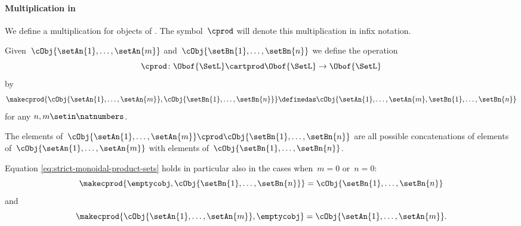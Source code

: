 {\paragraph{Multiplication in \SetL}
\label{sec:multiplication-for-SetL}
We define a multiplication for objects of \SetL.
The symbol~$\cprod$ will denote this multiplication in infix notation.

Given~$\cObj{\setAn{1}, \ldots, \setAn{m}}$ and~$\cObj{\setBn{1}, \ldots, \setBn{n}}$ we define the operation
\begin{equation}
    \label{eq:mult-setl-sign}
    \cprod \colon \Obof{\SetL} \cartprod \Obof{\SetL} \to \Obof{\SetL}
\end{equation}
by
\begin{equation}
    \label{eq:strict-monoidal-product-sets}
    \makecprod{
        \cObj{\setAn{1}, \ldots, \setAn{m}},
        \cObj{\setBn{1}, \ldots, \setBn{n}}
    } \definedas \cObj{\setAn{1}, \ldots, \setAn{m}, \setBn{1}, \ldots, \setBn{n}}
\end{equation}
for any $n, m \setin \natnumbers$.

The elements of~$\cObj{\setAn{1}, \ldots, \setAn{m}} \cprod \cObj{\setBn{1}, \ldots, \setBn{n}}$ are all possible concatenations of elements of~$\cObj{\setAn{1}, \ldots, \setAn{m}}$ with elements of~$\cObj{\setBn{1}, \ldots, \setBn{n}}$.

Equation \cref{eq:strict-monoidal-product-sets} holds in particular also in the cases when~$m = 0$ or~$n =0$:
\begin{equation}
    \makecprod{
        \emptycobj,
        \cObj{\setBn{1}, \ldots, \setBn{n}}
    } =
    \cObj{
        \setBn{1}, \ldots, \setBn{n}
    }
\end{equation}
and
\begin{equation}
    \makecprod{
        \cObj{\setAn{1}, \ldots, \setAn{m}},
        \emptycobj
    } =
    \cObj{
        \setAn{1}, \ldots, \setAn{m}
    }.
\end{equation}


}
